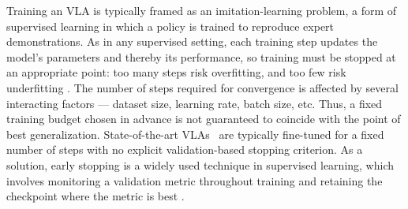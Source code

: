 \documentclass[11pt]{article}
\numberwithin{equation}{section}
\numberwithin{table}{section}
\numberwithin{figure}{section}
\begin{document}
Training an VLA is typically framed as an imitation-learning problem, a form of supervised learning in
which a policy is trained to reproduce expert demonstrations. As in any supervised setting, each training
step updates the model's parameters and thereby its performance, so training must be stopped at an
appropriate point: too many steps risk overfitting, and too few risk underfitting \cite{ying2019overview}.
The number of steps required for convergence is affected by several interacting factors ---
dataset size, learning rate, batch size, etc. Thus, a fixed training budget chosen in
advance is not guaranteed to coincide with the point of best generalization. State-of-the-art
VLAs~\cite{kim2024openvla,shukor2025smolvla,black2024pi0} are typically fine-tuned for a fixed number of
steps with no explicit validation-based stopping criterion. As a solution, early stopping is a widely used technique in supervised learning, 
which involves monitoring a validation metric throughout training and retaining the checkpoint where the metric
 is best \cite{goodfellow2016deep}. 
\end{document}
